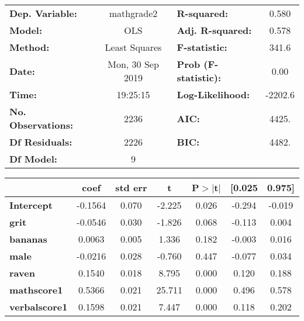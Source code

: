 \documentclass{report}
\begin{document}
\begin{center}
\begin{tabular}{lclc}
\toprule
\textbf{Dep. Variable:}    &    mathgrade2    & \textbf{  R-squared:         } &     0.580   \\
\textbf{Model:}            &       OLS        & \textbf{  Adj. R-squared:    } &     0.578   \\
\textbf{Method:}           &  Least Squares   & \textbf{  F-statistic:       } &     341.6   \\
\textbf{Date:}             & Mon, 30 Sep 2019 & \textbf{  Prob (F-statistic):} &     0.00    \\
\textbf{Time:}             &     19:25:15     & \textbf{  Log-Likelihood:    } &   -2202.6   \\
\textbf{No. Observations:} &        2236      & \textbf{  AIC:               } &     4425.   \\
\textbf{Df Residuals:}     &        2226      & \textbf{  BIC:               } &     4482.   \\
\textbf{Df Model:}         &           9      & \textbf{                     } &             \\
\bottomrule
\end{tabular}
\begin{tabular}{lcccccc}
                         & \textbf{coef} & \textbf{std err} & \textbf{t} & \textbf{P$> |$t$|$} & \textbf{[0.025} & \textbf{0.975]}  \\
\midrule
\textbf{Intercept}       &      -0.1564  &        0.070     &    -2.225  &         0.026        &       -0.294    &       -0.019     \\
\textbf{grit}            &      -0.0546  &        0.030     &    -1.826  &         0.068        &       -0.113    &        0.004     \\
\textbf{bananas}         &       0.0063  &        0.005     &     1.336  &         0.182        &       -0.003    &        0.016     \\
\textbf{male}            &      -0.0216  &        0.028     &    -0.760  &         0.447        &       -0.077    &        0.034     \\
\textbf{raven}           &       0.1540  &        0.018     &     8.795  &         0.000        &        0.120    &        0.188     \\
\textbf{mathscore1}      &       0.5366  &        0.021     &    25.711  &         0.000        &        0.496    &        0.578     \\
\textbf{verbalscore1}    &       0.1598  &        0.021     &     7.447  &         0.000        &        0.118    &        0.202     \\

\end{tabular}
\end{center}
\end{document}
